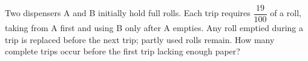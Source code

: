 Two dispensers A and B initially hold full rolls. Each trip requires $\dfrac{19}{100}$ of a roll, taking from A first and using B only after A empties. Any roll emptied during a trip is replaced before the next trip; partly used rolls remain. How many complete trips occur before the first trip lacking enough paper?
